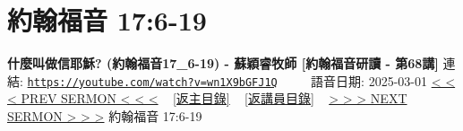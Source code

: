 \documentclass{book}
\begin{document}
\section{約翰福音 17:6-19}
\label{sec:wn1X9bGFJ1Q}
\textbf{什麼叫做信耶穌? (約翰福音17\_6-19) - 蘇穎睿牧師 [約翰福音研讀 - 第68講]}
\newline
\newline
連結: \href{https://youtube.com/watch?v=wn1X9bGFJ1Q}{\texttt{https://youtube.com/watch?v=wn1X9bGFJ1Q}} ~~~~ 語音日期: 2025-03-01
\newline
\newline
\hyperref[sec:wiDRWRXrtjM]{< < < PREV SERMON < < <}
~
\hyperlink{toc}{[返主目錄]}
~
\hyperref[ch:preacher10]{[返講員目錄]}
~
\hyperref[sec:cPwA4cZWWYs]{> > > NEXT SERMON > > >}
\newline
\newline
約翰福音 17:6-19
\newline
\end{document}
